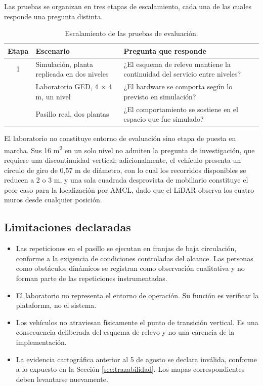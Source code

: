 \documentclass[12pt,letterpaper]{article}
\begin{document}
Las pruebas se organizan en tres etapas de escalamiento, cada una de las cuales responde una pregunta distinta.

\begin{table}[H]
    \centering
    \small
    \caption{Escalamiento de las pruebas de evaluación.}
    \label{tab:escalamiento}
    \begin{tabular}{@{}cp{4.1cm}p{7.6cm}@{}}
        \toprule
        \textbf{Etapa} & \textbf{Escenario} & \textbf{Pregunta que responde} \\ \midrule
        1 & Simulación, planta replicada en dos niveles & ¿El esquema de relevo mantiene la continuidad del servicio entre niveles? \\ \addlinespace
        2 & Laboratorio GED, 4 $\times$ 4 m, un nivel & ¿El hardware se comporta según lo previsto en simulación? \\ \addlinespace
        3 & Pasillo real, dos plantas & ¿El comportamiento se sostiene en el espacio que fue simulado? \\ \bottomrule
    \end{tabular}
\end{table}

El laboratorio no constituye entorno de evaluación sino etapa de puesta en marcha. Sus 16 m\textsuperscript{2} en un solo nivel no admiten la pregunta de investigación, que requiere una discontinuidad vertical; adicionalmente, el vehículo presenta un círculo de giro de 0,57 m de diámetro, con lo cual los recorridos disponibles se reducen a 2 o 3 m, y una sala cuadrada desprovista de mobiliario constituye el peor caso para la localización por AMCL, dado que el LiDAR observa los cuatro muros desde cualquier posición.

\subsection{Limitaciones declaradas}

\begin{itemize}
    \item Las repeticiones en el pasillo se ejecutan en franjas de baja circulación, conforme a la exigencia de condiciones controladas del alcance. Las personas como obstáculos dinámicos se registran como observación cualitativa y no forman parte de las repeticiones instrumentadas.
    \item El laboratorio no representa el entorno de operación. Su función es verificar la plataforma, no el sistema.
    \item Los vehículos no atraviesan físicamente el punto de transición vertical. Es una consecuencia deliberada del esquema de relevo y no una carencia de la implementación.
    \item La evidencia cartográfica anterior al 5 de agosto se declara inválida, conforme a lo expuesto en la Sección \ref{sec:trazabilidad}. Los mapas correspondientes deben levantarse nuevamente.
\end{itemize}
\end{document}
